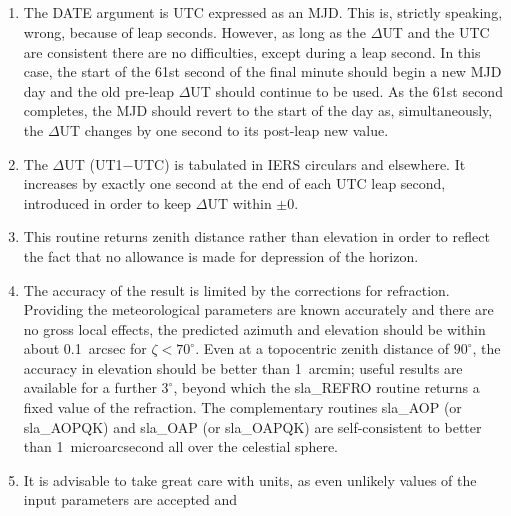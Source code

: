 {
  \\
  \\
  \\
  \\
}
\notes
{
 \begin{enumerate}
  \item The DATE argument is UTC expressed as an MJD.  This is,
        strictly speaking, wrong, because of leap seconds.  However,
        as long as the $\Delta$UT and the UTC are consistent there
        are no difficulties, except during a leap second.  In this
        case, the start of the 61st second of the final minute should
        begin a new MJD day and the old pre-leap $\Delta$UT should
        continue to be used.  As the 61st second completes, the MJD
        should revert to the start of the day as, simultaneously,
        the $\Delta$UT changes by one second to its post-leap new value.
  \item The $\Delta$UT (UT1$-$UTC) is tabulated in IERS circulars and
        elsewhere.  It increases by exactly one second at the end of
        each UTC leap second, introduced in order to keep $\Delta$UT
        within $\pm0$.
  \item This routine returns zenith distance rather than elevation
        in order to reflect the fact that no allowance is made for
        depression of the horizon.
  \item The accuracy of the result is limited by the corrections for
        refraction.  Providing the meteorological parameters are
        known accurately and there are no gross local effects, the
        predicted azimuth and elevation should be within about
        0.1~arcsec for $\zeta<70^{\circ}$.  Even
        at a topocentric zenith distance of
        $90^{\circ}$, the accuracy in elevation should be better than
        1~arcmin;  useful results are available for a further
        $3^{\circ}$, beyond which the sla\_REFRO routine returns a
        fixed value of the refraction.  The complementary
        routines sla\_AOP (or sla\_AOPQK) and sla\_OAP (or sla\_OAPQK)
        are self-consistent to better than 1~microarcsecond all over
        the celestial sphere.
  \item It is advisable to take great care with units, as even
        unlikely values of the input parameters are accepted and

\end{enumerate}}
